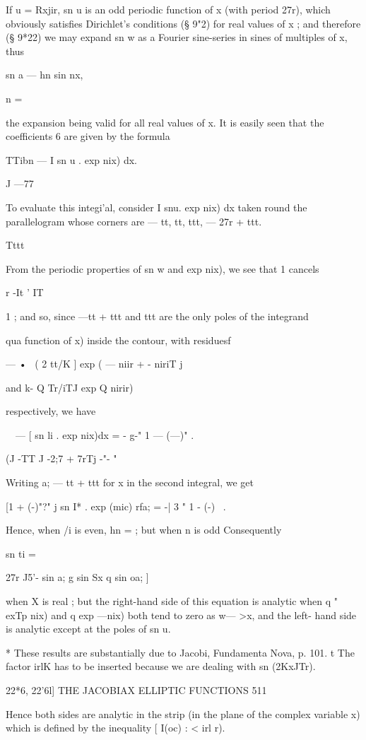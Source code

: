 If u = Rxjir, sn u is an odd periodic function of x (with period 27r),
which obviously satisfies Dirichlet's conditions (§ 9"2) for real
values of x ; and therefore (§ 9*22) we may expand sn w as a Fourier
sine-series in sines of multiples of x, thus

sn a — hn sin nx,

n = \

the expansion being valid for all real values of x. It is easily seen
that the coefficients 6 are given by the formula

TTibn — I sn u . exp nix) dx.

J —77

To evaluate this integi'al, consider I snu. exp nix) dx taken round
the parallelogram whose corners are — tt, tt, ttt, — 27r + ttt.

Tttt

From the periodic properties of sn w and exp nix), we see that 1
cancels

r -It ' IT

1 ; and so, since —tt + ttt and ttt are the only poles of the
integrand

 qua function of x) inside the contour, with residuesf

— •~ ( 2 tt/K ] exp ( — niir + - niriT j

and k- Q Tr/iTJ exp Q nirir)

respectively, we have

\ \ — [ sn li . exp nix)dx = - g-" 1 — (—)" .

(J -TT J -2;7 + 7rTj -"- "

Writing a; — tt + ttt for x in the second integral, we get

[1 + (-)"?" j sn I* . exp (mic) rfa; = -| 3 " 1 - (-)~ .

Hence, when /i is even, hn = ; but when n is odd Consequently

sn ti =

27r J5'- sin a; g sin Sx q sin oa; ]

when X is real ; but the right-hand side of this equation is analytic
when q " exTp nix) and q exp —nix) both tend to zero as w— >x, and the
left- hand side is analytic except at the poles of sn u.

* These results are substantially due to Jacobi, Fundamenta Nova, p.
101. t The factor irlK has to be inserted because we are dealing with
sn (2KxJTr).

22*6, 22'6l] THE JACOBIAX ELLIPTIC FUNCTIONS 511

Hence both sides are analytic in the strip (in the plane of the
complex variable x) which is defined by the inequality [ I(oc) : < irl
r).

